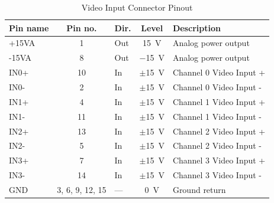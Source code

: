 \begin{table}[ht]
  \centering
  \begin{tabular}{l c l c l}
    \toprule
    Pin name  & Pin no.     & Dir. & Level            & Description                                \\
    \midrule
    +15VA 	& 1   	& Out  	& \SI{15}{\volt}   	& Analog power output          	\\
    -15VA  	& 8 	& Out  	& \SI{-15}{\volt} 	& Analog power output  			\\[3pt]
	
	IN0+	& 10	& In	& $\pm$\SI{15}{\volt}					& Channel 0 Video Input +		\\
	IN0-	& 2	    & In	& $\pm$\SI{15}{\volt}					& Channel 0 Video Input -		\\
	IN1+	& 4	    & In	& $\pm$\SI{15}{\volt}					& Channel 1 Video Input +		\\
	IN1-	& 11	& In	& $\pm$\SI{15}{\volt}					& Channel 1 Video Input -		\\
	IN2+	& 13	& In	& $\pm$\SI{15}{\volt}					& Channel 2 Video Input +		\\
	IN2-	& 5	    & In	& $\pm$\SI{15}{\volt}					& Channel 2 Video Input -		\\
	IN3+	& 7	    & In	& $\pm$\SI{15}{\volt}					& Channel 3 Video Input +		\\
	IN3-	& 14	& In	& $\pm$\SI{15}{\volt}					& Channel 3 Video Input -		\\[3pt]
	
    GND    	& 3, 6, 9, 12, 15 & —    & \SI{0}{\volt}    & Ground return  		\\

    \bottomrule
  \end{tabular}
  \caption{Video Input Connector Pinout}
  \label{tab:video}
\end{table}